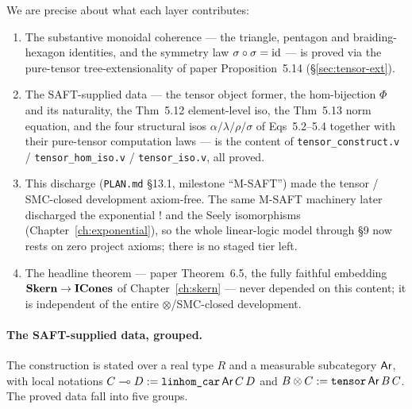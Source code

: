 We are precise about what each layer contributes:
\begin{enumerate}
  \item[(a)] The substantive monoidal coherence --- the triangle,
    pentagon and braiding-hexagon identities, and the symmetry law
    $\sigma \circ \sigma = \mathrm{id}$ --- is proved via the pure-tensor
    tree-extensionality of paper Proposition~5.14
    (\S\ref{sec:tensor-ext}).
  \item[(b)] The SAFT-supplied data --- the tensor object former, the
    hom-bijection $\Phi$ and its naturality, the Thm~5.12 element-level
    iso, the Thm~5.13 norm equation, and the four structural isos
    $\alpha/\lambda/\rho/\sigma$ of Eqs~5.2--5.4 together with their
    pure-tensor computation laws --- is the content of
    \texttt{tensor\_construct.v} / \texttt{tensor\_hom\_iso.v} /
    \texttt{tensor\_iso.v}, all proved.
  \item[(c)] This discharge (\texttt{PLAN.md} \S13.1, milestone
    ``M-SAFT'') made the tensor / SMC-closed development axiom-free. The
    same M-SAFT machinery later discharged the exponential $\mathord{!}$
    and the Seely isomorphisms (Chapter~\ref{ch:exponential}), so the
    whole linear-logic model through \S9 now rests on zero project
    axioms; there is no staged tier left.
  \item[(d)] The headline theorem --- paper Theorem~6.5, the fully
    faithful embedding $\mathbf{Skern} \to \mathbf{ICones}$ of
    Chapter~\ref{ch:skern} --- never depended on this content; it is
    independent of the entire $\otimes$/SMC-closed development.
\end{enumerate}

\paragraph{The SAFT-supplied data, grouped.}
The construction is stated over a real type $R$ and a measurable
subcategory $\mathsf{Ar}$, with local notations $C \multimap D :=
\texttt{linhom\_car}\,\mathsf{Ar}\,C\,D$ and $B \otimes C := \texttt{tensor}\,\mathsf{Ar}\,B\,C$.
The proved data fall into five groups.

